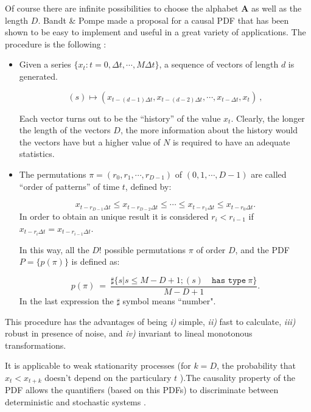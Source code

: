  Of course there are infinite possibilities to choose the alphabet $\mathbf{ A}$ as well as the length $D$.
Bandt \& Pompe made a proposal for a causal PDF that has been shown to be easy to implement and useful in a great variety of applications.  The procedure is the
following \cite{Pompe2002,Keller2003,Keller2005}:
\begin{itemize}
\item Given a
series $\{x_t : t=0, \Delta t, \cdots,M\Delta t \}$, a sequence of
vectors of length $d$ is generated.

\begin{equation}
\label{eq:vectores}
(s)\mapsto \left(x_{t-(d-1)\Delta t},x_{t-(d-2)\Delta t},\cdots,x_{t-\Delta t},x_{t}\right) \ ,
\end{equation}

Each vector turns out to be the ``history'' of the value $x_t$.
Clearly, the longer the length of the vectors $D$, the more
information about the history would the vectors have but a higher value of $N$ is required to have an adequate statistics. 
\item The
permutations $\pi=(r_0, r_1, \cdots, r_{D-1})$ of $(0, 1, \cdots,
D-1)$ are called ``order of patterns'' of time $t$, defined by:

\begin{equation}
\label{eq:permuta}
x_{t-r_{D-1}\Delta t}\le x_{t-r_{D-2}\Delta t}\le\cdots\le x_{t-r_{1}\Delta t}\le x_{t-r_0\Delta t}.
\end{equation}
%
In order to obtain an unique result it is considered $r_i
<r_{i-1}$ if $x_{t-r_{i}\Delta t}=x_{t-r_{i-1}\Delta t}$.

In this way, all the $D!$ possible permutations $\pi$ of order
$D$, and the PDF $P=\{p(\pi)\}$ is defined as:

\begin{equation}
\label{eq:frequ}
p(\pi)~=~ \frac{\sharp \{s|s\leq M-D+1; (s) \quad \texttt{has type}~\pi\}}{M-D+1}.
\end{equation}
In the last expression the $\sharp$ symbol means ``number".
\end{itemize}
This procedure has the advantages of being {\it i)\/} simple, {\it
ii)\/} fast to calculate, {\it iii)\/} robust in presence of
noise, and {\it iv)\/} invariant to lineal monotonous
transformations.

It is applicable to weak stationarity processes (for
$k=D$, the probability that $x_t < x_{t+k}$ doesn't depend on the
particulary $t$ \cite{Pompe2002}).The causality property of the
PDF allows the quantifiers (based on this PDFs) to discriminate
between deterministic and stochastic systems \cite{Rosso2007B}.

